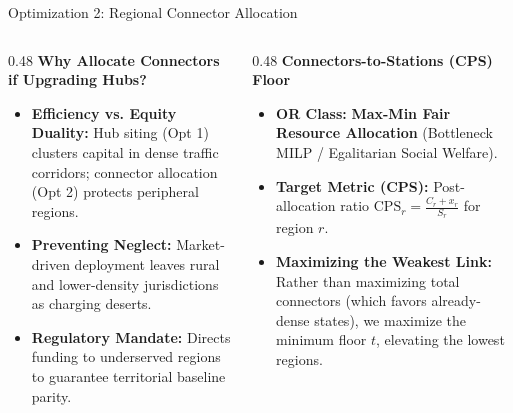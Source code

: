 \documentclass[aspectratio=169,10pt]{beamer}
\begin{document}
\begin{frame}{Optimization 2: Regional Connector Allocation}
  \vspace{0.15cm}
  \begin{columns}[T]
    \begin{column}{0.48\textwidth}
      \textbf{\color{Navy}Why Allocate Connectors if Upgrading Hubs?}
      \begin{itemize}\setlength{\itemsep}{0.18cm}
        \item \textbf{Efficiency vs. Equity Duality:} Hub siting (Opt 1) clusters capital in dense traffic corridors; connector allocation (Opt 2) protects peripheral regions.
        \item \textbf{Preventing Neglect:} Market-driven deployment leaves rural and lower-density jurisdictions as charging deserts.
        \item \textbf{Regulatory Mandate:} Directs funding to underserved regions to guarantee territorial baseline parity.
      \end{itemize}
    \end{column}
    \begin{column}{0.48\textwidth}
      \textbf{\color{Teal}Connectors-to-Stations (CPS) Floor}
      \begin{itemize}\setlength{\itemsep}{0.18cm}
        \item \textbf{OR Class:} \textbf{Max-Min Fair Resource Allocation} (Bottleneck MILP / Egalitarian Social Welfare).
        \item \textbf{Target Metric (CPS):} Post-allocation ratio $\text{CPS}_r = \frac{C_r + x_r}{S_r}$ for region $r$.
        \item \textbf{Maximizing the Weakest Link:} Rather than maximizing total connectors (which favors already-dense states), we maximize the minimum floor $t$, elevating the lowest regions.
      \end{itemize}
    \end{column}
  \end{columns}
\end{frame}
\end{document}

